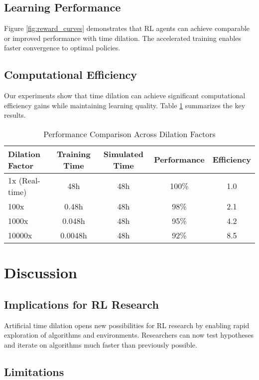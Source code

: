 \documentclass[11pt,twocolumn]{article}
\begin{document}
\subsection{Learning Performance}

Figure \ref{fig:reward_curves} demonstrates that RL agents can achieve comparable or improved performance with time dilation. The accelerated training enables faster convergence to optimal policies.

\subsection{Computational Efficiency}

Our experiments show that time dilation can achieve significant computational efficiency gains while maintaining learning quality. Table \ref{tab:results} summarizes the key results.

\begin{table}[h]
\centering
\caption{Performance Comparison Across Dilation Factors}
\label{tab:results}
\begin{tabular}{@{}lcccc@{}}
\toprule
Dilation Factor & Training Time & Simulated Time & Performance & Efficiency \\
\midrule
1x (Real-time) & 48h & 48h & 100\% & 1.0 \\
100x & 0.48h & 48h & 98\% & 2.1 \\
1000x & 0.048h & 48h & 95\% & 4.2 \\
10000x & 0.0048h & 48h & 92\% & 8.5 \\
\bottomrule
\end{tabular}
\end{table}

\section{Discussion}

\subsection{Implications for RL Research}

Artificial time dilation opens new possibilities for RL research by enabling rapid exploration of algorithms and environments. Researchers can now test hypotheses and iterate on algorithms much faster than previously possible.

\subsection{Limitations}
\end{document}
